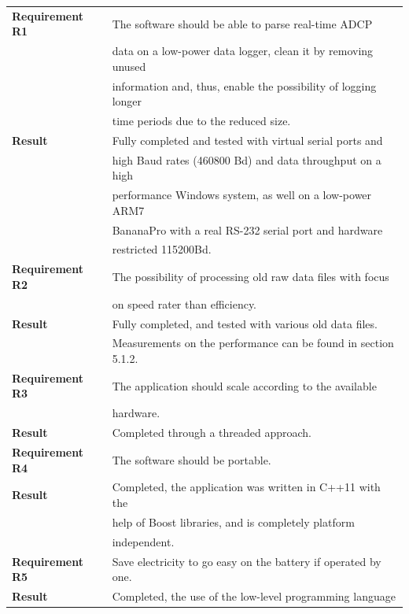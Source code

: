 \begin{table}[!ht]
\centering
	\begin{tabular}{|l|l|}
	  \hline
	  	\textbf{Requirement R1} 
	  	& The software should be able to parse real-time ADCP\\ 
	  	& data on a low-power data logger, clean it by removing unused\\
	  	& information and, thus, enable the possibility of logging longer\\
	  	& time periods due to the reduced size.\\ \hline
	  	\textbf{Result} 
	  	& Fully completed and tested with virtual serial ports and\\ 
	  	& high Baud rates (460800 Bd) and data throughput on a high \\ 
	  	& performance Windows system, as well on a low-power ARM7 \\ 
	  	& BananaPro with a real RS-232 serial port and hardware \\ 
	  	& restricted 115200Bd.\\
	  \hline
	  \hline
	  	\textbf{Requirement R2} 
	  	& The possibility of processing old raw data files with focus\\
	  	& on speed rater than efficiency.\\ \hline
	  	\textbf{Result} 
	  	& Fully completed, and tested with various old data files. \\
	  	& Measurements on the performance can be found in section 5.1.2.\\
	  \hline
	  \hline
	  	\textbf{Requirement R3} 
	  	& The application should scale according to the available\\
	  	& hardware.\\ \hline
	  	\textbf{Result} & Completed through a threaded approach.\\
	  \hline
	  \hline
	  	\textbf{Requirement R4} 
	  	& The software should be portable. \\ \hline
	  	\textbf{Result} 
	  	& Completed, the application was written in C++11 with the\\
	  	& help of Boost libraries, and is completely platform\\
	  	& independent.\\
	  \hline
	  \hline
	  	\textbf{Requirement R5} 
	  	& Save electricity to go easy on the battery if operated by one.\\ \hline
	  	\textbf{Result} 
	  	& Completed, the use of the low-level programming language\\

\end{tabular}
\end{table}
